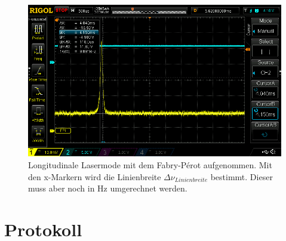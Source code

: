 \begin{figure}[ht]
    \centering
    \includegraphics[width = \linewidth]{Bilder/Auswertung/FabryPerotLinienbreiteSingle.png}
    \caption{Longitudinale Lasermode mit dem Fabry-Pérot aufgenommen. Mit den x-Markern wird die Linienbreite $\Delta \nu_{Linienbreite}$ bestimmt. Dieser muss aber noch in Hz umgerechnet werden.}
    \label{bild:LininebreiteSingle}
\end{figure}

\clearpage

\section{Protokoll}

